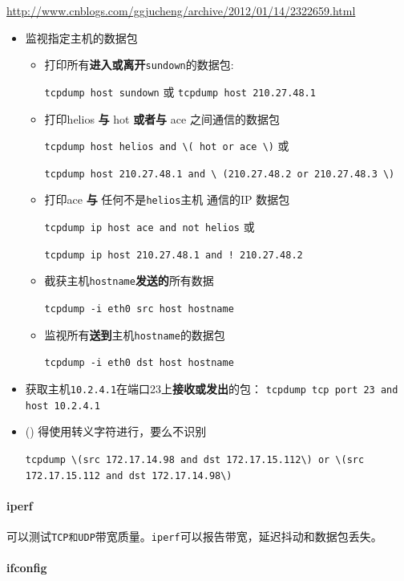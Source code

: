 \documentclass[UTF8,a4paper,12pt]{ctexbook}
\begin{document}
				\url{http://www.cnblogs.com/ggjucheng/archive/2012/01/14/2322659.html}
				\begin{itemize}[itemindent = 1em]
					\item 监视指定主机的数据包
						\begin{itemize}
							\item 打印所有\textbf{进入或离开}\verb|sundown|的数据包:
							
								\verb|tcpdump host sundown| 或 \verb|tcpdump host 210.27.48.1 |
							\item 打印helios \textbf{与} hot \textbf{或者与} ace 之间通信的数据包
							
								\verb|tcpdump host helios and \( hot or ace \)| 或 
								
							    \verb|tcpdump host 210.27.48.1 and \ (210.27.48.2 or 210.27.48.3 \)| 
							\item  打印ace \textbf{与} 任何不是\verb|helios|主机 通信的IP 数据包
							
								\verb|tcpdump ip host ace and not helios| 或 
								
								\verb|tcpdump ip host 210.27.48.1 and ! 210.27.48.2|
							\item 截获主机\verb|hostname|\textbf{发送的}所有数据
							
								\verb|tcpdump -i eth0 src host hostname|
							\item 监视所有\textbf{送到}主机\verb|hostname|的数据包
							
								\verb|tcpdump -i eth0 dst host hostname|
						\end{itemize}
						
					\item 获取主机\verb|10.2.4.1|在端口23上\textbf{接收或发出}的包：
							\verb|tcpdump tcp port 23 and host 10.2.4.1|
					
					\item  () 得使用转义字符进行，要么不识别
					
						\verb|tcpdump \(src 172.17.14.98 and dst 172.17.15.112\) or \(src 172.17.15.112 and dst 172.17.14.98\)|
				\end{itemize}
				
			\paragraph{iperf}可以测试\verb|TCP和UDP|带宽质量。\verb|iperf|可以报告带宽，延迟抖动和数据包丢失。
			
			\paragraph{ifconfig}
			
\end{document}
